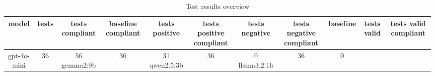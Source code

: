 
  \begin{table}[h!]
  \centering
  \begin{tabular}{|c|c|c|c|c|c|c|c|c|c|c|}
  \hline
  model & tests & tests compliant & baseline compliant & tests positive & tests positive compliant & tests negative & tests negative compliant & baseline & tests valid & tests valid compliant \\
  \hline
  gpt-4o-mini & 36 & 56%
\hline
gemma2:9b & 36 & 31%
\hline
qwen2.5:3b & 36 & 0%
\hline
llama3.2:1b & 36 & 0%
  \end{tabular}
  \caption{Test results overview}
  
  \end{table}
  